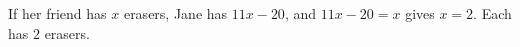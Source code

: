 If her friend has $x$ erasers, Jane has $11x-20$, and $11x-20=x$ gives $x=2$. Each has $\boxed{2}$ erasers.
